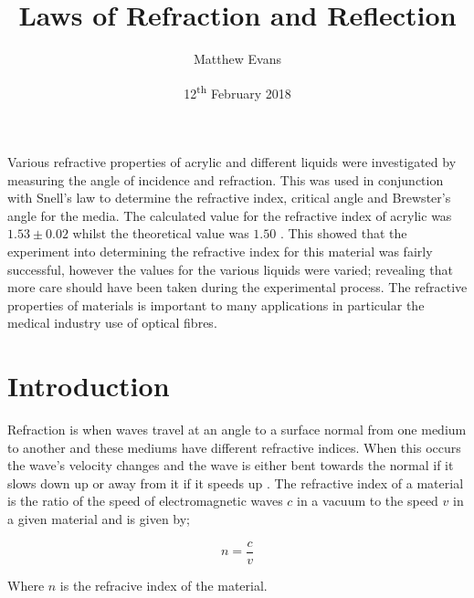 \documentclass{article}
\begin{document}
\title{Laws of Refraction and Reflection} %
\author{Matthew Evans}%
\date{12\textsuperscript{th} February 2018} %
\maketitle %
\begin{onecolabstract}
\noindent
Various refractive properties of acrylic and different liquids were investigated by  measuring the angle of incidence and refraction. This was used in conjunction with Snell's law to determine the refractive index, critical angle and Brewster's angle for the media. The calculated value for the refractive index of acrylic was $1.53 \pm 0.02$ whilst the theoretical value was $1.50$ \cite{Paper01}. This showed that the experiment into determining the refractive index for this material was fairly successful, however the values for the various liquids were varied; revealing that more care should have been taken during the experimental process. The refractive properties of materials is important to many applications {\textendash} in particular the medical industry use of optical fibres.

\end{onecolabstract}
\vspace{5 mm} %


\section{Introduction}
\label{sec:introduction}

Refraction is when waves travel at an angle to a surface normal from one medium to another and these mediums have different refractive indices. When this occurs the wave's velocity changes and the wave is either bent towards the normal if it slows down up or away from it if it speeds up \cite{Paper01}. The refractive index of a material is the ratio of the speed of electromagnetic waves $c$ in a vacuum to the speed $v$ in a given material and is given by;

\begin{equation}
\label{eq:refractive-index}
n = \frac{c}{v} 
\end{equation}

\vspace{2mm}
\noindent
Where $n$ is the refracive index of the material. 
\end{document}
